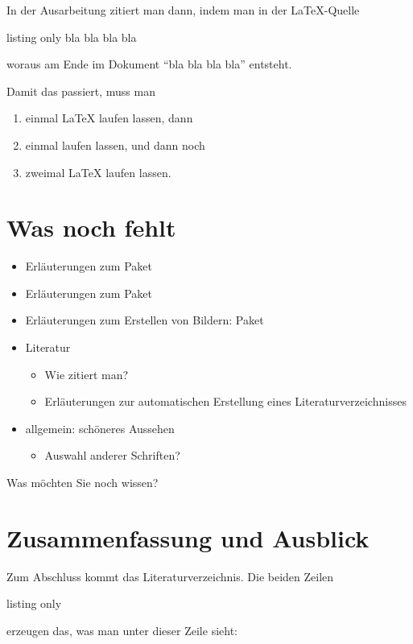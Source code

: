 In der Ausarbeitung zitiert man dann, indem man in der \LaTeX-Quelle
%
\begin{tcblisting}{listing only}
  bla bla \cite{Worsch_2012_IUA_ip_acri} bla bla
\end{tcblisting}
%
woraus am Ende im Dokument \enquote{bla bla \cite{Worsch_2012_IUA_ip_acri} bla bla} entsteht.

Damit das passiert, muss man
\begin{enumerate}
\item einmal LaTeX{} laufen lassen, dann
\item einmal  laufen lassen, und dann noch
\item zweimal \LaTeX{} laufen lassen.
\end{enumerate}

\section{Was noch fehlt}
\label{sec:todo}

\begin{itemize}[noitemsep]
\item Erläuterungen zum Paket 
\item Erläuterungen zum Paket 
\item Erläuterungen zum Erstellen von Bildern: Paket 
\item Literatur
  \begin{itemize}
  \item Wie zitiert man?
  \item Erläuterungen zur automatischen Erstellung eines Literaturverzeichnisses
  \end{itemize}
\item allgemein: schöneres Aussehen
  \begin{itemize}
  \item Auswahl anderer Schriften?
  \end{itemize}
\end{itemize}
%
Was möchten Sie noch wissen?

\section{Zusammenfassung und Ausblick}
\label{sec:summary}

Zum Abschluss kommt das Literaturverzeichnis.
%
Die beiden Zeilen

\begin{tcblisting}{listing only}
  
  
\end{tcblisting}

erzeugen das, was man unter dieser Zeile sieht:





